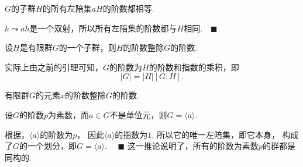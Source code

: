   \begin{lemma}[左陪集与阶]
    $G$的子群$H$的所有左陪集$aH$的阶数都相等.
  \end{lemma}
  \proof
    $h\leadsto ah$是一个双射，所以所有左陪集的阶数都与$H$相同.$\quad\blacksquare$

  \begin{thm}[Lagrange]
    设$H$是有限群$G$的一个子群，则$H$的阶数整除$G$的阶数.
  \end{thm}
  \remark
    实际上由之前的引理可知，$G$的阶数为$H$的阶数和指数的乘积，即
    \begin{equation}
      \label{equ: 阶、指数}
      |G| = |H|[G:H].
    \end{equation}

  \begin{cor}
    \label{cor: 元素与群的阶}
    有限群$G$的元素$x$的阶数整除$G$的阶数.
  \end{cor}

  \begin{cor}
    设$G$的阶数$p$为素数，而$a\in G$不是单位元，则$G=\langle a\rangle$.
  \end{cor}
  \proof
    根据，$\langle a \rangle$的阶数为$p$，
    因此$\langle a\rangle$的指数为$1$. 所以它的唯一左陪集，即它本身，
    构成了$G$的一个划分，即$G=\langle a\rangle$. $\quad\blacksquare$
  \remark
    这一推论说明了，所有的阶数为素数$p$的群都是同构的.



